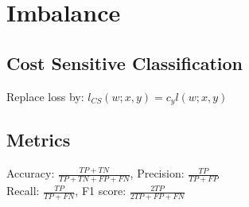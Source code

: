 \section*{Imbalance}
\subsection*{Cost Sensitive Classification}

Replace loss by: $l_{CS}(w;x,y) = c_y l(w;x,y)$

\subsection*{Metrics}
Accuracy: $\frac{TP+TN}{TP+TN+FP+FN}$, Precision: $\frac{TP}{TP+FP}$\\ Recall: $\frac{TP}{TP+FN}$, F1 score: $\frac{2TP}{2TP+FP+FN}$